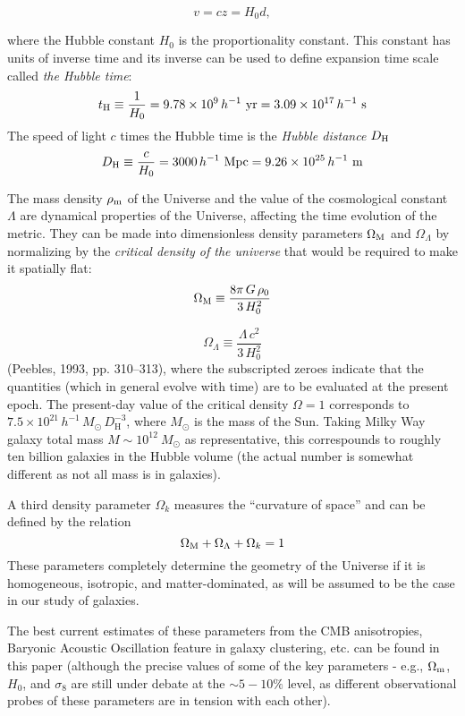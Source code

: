 $$v=cz=H_0d,$$

where the Hubble constant $H_0$ is the proportionality constant. This constant has units of inverse time and its inverse can be used to define expansion time scale called {\it the Hubble time}:
\begin{equation}
t_{\rm H}\equiv\frac{1}{H_0}= 9.78\times10^9\,h^{-1}~{\rm yr}= 3.09\times10^{17}\,h^{-1}~{\rm s}
\end{equation}
The speed of light $c$ times the Hubble time is the {\it Hubble
distance} $D_{\rm H}$
\begin{equation}
D_{\rm H}\equiv\frac{c}{H_0}
= 3000\,h^{-1}~{\rm Mpc}= 9.26\times10^{25}\,h^{-1}~{\rm m}
\end{equation}

The mass density $\rho_{\rm m}$ of the Universe and the value of the
cosmological constant $\Lambda$ are dynamical properties of the
Universe, affecting the time evolution of the metric.  They can be
made into dimensionless density parameters $\Omega_{\rm M}$ and
$\Omega_{\Lambda}$ by normalizing by the {\it critical density of the universe} that would be required to make it spatially flat:
$$
\Omega_{\rm M}\equiv\frac{8\pi\,G\,\rho_0}{3\,H_0^2}
$$

$$
\Omega_{\Lambda}\equiv\frac{\Lambda\,c^2}{3\,H_0^2}
$$
(Peebles, 1993, pp. 310--313), where the subscripted zeroes indicate
that the quantities (which in general evolve with time) are to be
evaluated at the present epoch. The present-day value of the
critical density $\Omega=1$ corresponds to $7.5\times
10^{21}\,h^{-1}\,M_{\odot}\,D_{\mathrm{H}}^{-3}$, where $M_{\odot}$ is the
mass of the Sun. Taking Milky Way galaxy total mass $M\sim 10^{12}\ M_{\odot}$ as representative, this correspounds to roughly ten billion galaxies in the Hubble volume (the actual number is somewhat different as not all mass is in galaxies). 


A third density parameter $\Omega_k$
measures the ``curvature of space'' and can be defined by the relation
\begin{equation}
\Omega_{\rm M}+\Omega_{\Lambda}+\Omega_k= 1
\end{equation}
These parameters completely determine the geometry of the Universe if
it is homogeneous, isotropic, and matter-dominated, as will be assumed to be the case
in our study of galaxies.  

The best current estimates of these parameters from the CMB anisotropies, Baryonic Acoustic Oscillation feature in galaxy clustering, etc. can be found in this paper (although the precise values of some of the key parameters - e.g., $\Omega_{\rm m}$, $H_0$, and $\sigma_8$ are still under debate at the $\sim 5-10\%$ level, as different observational probes of these parameters are in tension with each other).


